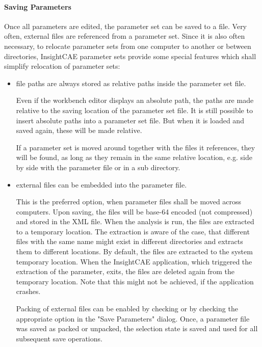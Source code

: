 \paragraph{Saving Parameters}
Once all parameters are edited, the parameter set can be saved to a file.
Very often, external files are referenced from a parameter set.
Since it is also often necessary, to relocate parameter sets from one computer to another or between directories, InsightCAE parameter sets provide some special features which shall simplify relocation of parameter sets:
\begin{itemize}
\item file paths are always stored as relative paths inside the parameter set file.

Even if the workbench editor displays an absolute path, the paths are made relative to the saving location of the parameter set file. It is still possible to insert absolute paths into a parameter set file. But when it is loaded and saved again, these will be made relative.

If a parameter set is moved around together with the files it references, they will be found, as long as they remain in the same relative location, e.g. side by side with the parameter file or in a sub directory.

\item external files can be embedded into the parameter file.

This is the preferred option, when parameter files shall be moved across computers. Upon saving, the files will be base-64 encoded (not compressed) and stored in the XML file.
When the analysis is run, the files are extracted to a temporary location.
The extraction is aware of the case, that different files with the same name might exist in different directories and extracts them to different locations.
By default, the files are extracted to the system temporary location.
When the InsightCAE application, which triggered the extraction of the parameter, exits, the files are deleted again from the temporary location. Note that this might not be achieved, if the application crashes.

Packing of external files can be enabled by checking  or by checking the appropriate option in the "Save Parameters" dialog.
Once, a parameter file was saved as packed or unpacked, the selection state is saved and used for all subsequent save operations.

\end{itemize}

